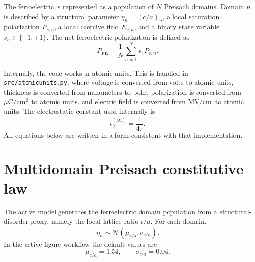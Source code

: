 \documentclass[11pt]{article}
\newcommand{\uc}{\ensuremath{\mu\text{C}/\text{cm}^2}}
\newcommand{\mvcm}{\ensuremath{\text{MV}/\text{cm}}}
\begin{document}
The ferroelectric is represented as a population of $N$ Preisach domains.
Domain $n$ is described by a structural parameter $\eta_n = (c/a)_n$, a local
saturation polarization $P_{s,n}$, a local coercive field $E_{c,n}$, and a
binary state variable $s_n \in \{-1,+1\}$. The net ferroelectric polarization
is defined as
\begin{equation}
P_{\mathrm{FE}} = \frac{1}{N}\sum_{n=1}^{N} s_n P_{s,n}.
\label{eq:pfe-average-mifm}
\end{equation}

Internally, the code works in atomic units. This is handled in
\texttt{src/atomicunits.py}, where voltage is converted from volts to atomic
units, thickness is converted from nanometers to bohr, polarization is
converted from \uc\ to atomic units, and electric field is converted from
\mvcm\ to atomic units. The electrostatic constant used internally is
\begin{equation}
\epsilon_0^{(\mathrm{au})} = \frac{1}{4\pi}.
\label{eq:eps0-au-mifm}
\end{equation}
All equations below are written in a form consistent with that implementation.

\section{Multidomain Preisach constitutive law}

The active model generates the ferroelectric domain population from a
structural-disorder proxy, namely the local lattice ratio $c/a$. For each
domain,
\begin{equation}
\eta_n \sim \mathcal{N}(\mu_{c/a}, \sigma_{c/a}).
\label{eq:ca-dist-mifm}
\end{equation}
In the active figure workflow the default values are
\begin{equation}
\mu_{c/a} = 1.54,
\qquad
\sigma_{c/a} = 0.04.
\label{eq:ca-active-mifm}
\end{equation}
\end{document}
